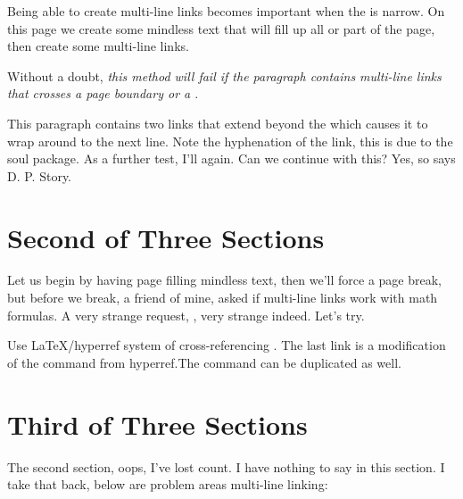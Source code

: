\documentclass{article}
\begin{document}
\parskip0pt

\begin{multicols}{2}
\noindent Being able to create multi-line links becomes important when the
\texttt{\string\linewidth} is narrow. On this page we create some
mindless text that will fill up all or part of the page, then create
some multi-line links.

Without a doubt, \textsl{this method will fail if the paragraph contains
multi-line links that crosses a \emph{page boundary} or a \emph{}}.

This paragraph contains two links that extend beyond the
 which causes it to wrap around to the next line. Note the
hyphenation of the link, this is due to the \textsf{soul} package.
As a further test, I'll  again. Can we continue with
this? Yes, so says D. P. Story.

\end{multicols}


\section{Second of Three Sections}\label{second}

Let us begin by having page filling mindless text,
then we'll force a page break, but before we break, a friend of
mine, asked if multi-line links work with math formulas. A very strange request,
, very strange
indeed. Let's try.

Use \LaTeX/hyperref system of cross-referencing
. The last link is a modification of
the \texttt{\string\nameref} command from hyperref.The
\texttt{\string\Nameref} command can be duplicated
 as well.

\newpage

\section{Third of Three Sections}\label{three}

The second section, oops, I've lost count. I have nothing to say in
this section. I take that back, below are problem areas multi-line
linking:
\end{document}
